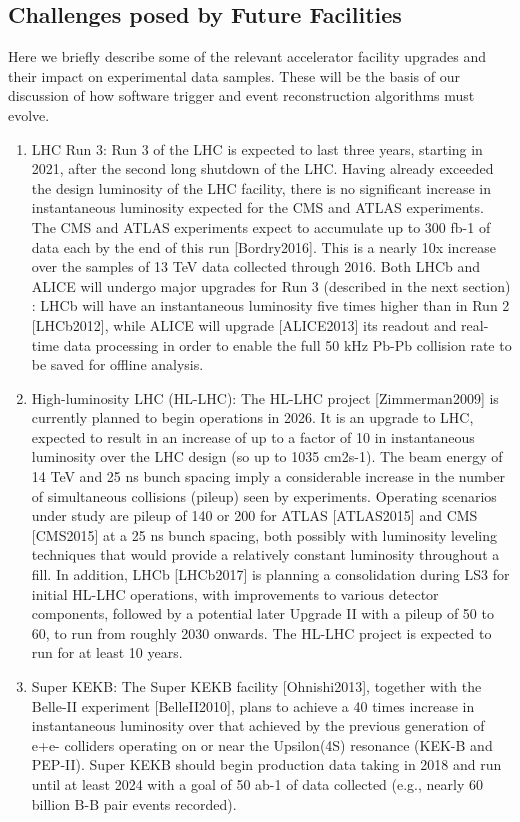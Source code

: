 \subsection{Challenges posed by Future Facilities }

Here we briefly describe some of the relevant accelerator facility upgrades and their impact on experimental data samples. These will be the basis of our discussion of how software trigger and event reconstruction algorithms must evolve.
\begin{enumerate}
\item 
LHC Run 3: Run 3 of the LHC is expected to last three years, starting in 2021, after the second long shutdown of the LHC. Having already exceeded the design luminosity of the LHC facility, there is no significant increase in instantaneous luminosity expected for the CMS and ATLAS experiments. The CMS and ATLAS experiments expect to accumulate up to 300 fb-1 of data each by the end of this run [Bordry2016]. This is a nearly 10x increase over the samples of 13 TeV data collected through 2016. Both LHCb and ALICE will undergo major upgrades for Run 3 (described in the next section) : LHCb will have an instantaneous luminosity five times higher than in Run 2 [LHCb2012], while ALICE will upgrade [ALICE2013] its readout and real-time data processing in order to enable the full 50 kHz Pb-Pb collision rate to be saved for offline analysis.
\item
High-luminosity LHC (HL-LHC): The HL-LHC project [Zimmerman2009] is currently planned to begin operations in 2026. It is an upgrade to LHC, expected to result in an increase of up to a factor of 10 in instantaneous luminosity over the LHC design (so up to 1035 cm2s-1). The beam energy of 14 TeV and 25 ns bunch spacing imply a considerable increase in the number of simultaneous collisions (pileup) seen by experiments. Operating scenarios under study are pileup of 140 or 200 for ATLAS [ATLAS2015] and CMS [CMS2015] at a 25 ns bunch spacing, both possibly with luminosity leveling techniques that would provide a relatively constant luminosity throughout a fill. In addition, LHCb [LHCb2017] is planning a consolidation during LS3 for initial HL-LHC operations, with improvements to various detector components, followed by a potential later Upgrade II with a pileup of 50 to 60, to run from roughly 2030 onwards. The HL-LHC project is expected to run for at least 10 years. 
\item
Super KEKB: The Super KEKB facility [Ohnishi2013], together with the Belle-II experiment [BelleII2010], plans to achieve a 40 times increase in instantaneous luminosity over that achieved by the previous generation of e+e- colliders operating on or near the Upsilon(4S) resonance (KEK-B and PEP-II). Super KEKB should begin production data taking in 2018 and run until at least 2024 with a goal of 50 ab-1 of data collected (e.g., nearly 60 billion B-B pair events recorded). 

\end{enumerate}
